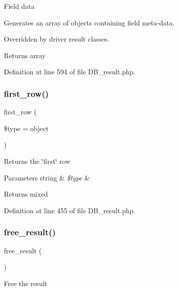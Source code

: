 Field data

Generates an array of objects containing field meta-\/data.

Overridden by driver result classes.

\begin{DoxyReturn}{Returns}
array 
\end{DoxyReturn}


Definition at line 594 of file D\+B\+\_\+result.\+php.

\mbox{\label{class_c_i___d_b__result_a9d7ddad4b02edf86c4f1ec27c0c8a2d7}} 
\subsubsection{\texorpdfstring{first\_row()}{first\_row()}}
{\footnotesize\ttfamily first\+\_\+row (\begin{DoxyParamCaption}\item[{}]{\$type = {\ttfamily \textquotesingle{}object\textquotesingle{}} }\end{DoxyParamCaption})}

Returns the \char`\"{}first\char`\"{} row


\begin{DoxyParams}[1]{Parameters}
string & {\em \$type} & \\
\hline
\end{DoxyParams}
\begin{DoxyReturn}{Returns}
mixed 
\end{DoxyReturn}


Definition at line 455 of file D\+B\+\_\+result.\+php.

\mbox{\label{class_c_i___d_b__result_aad2d98d6beb3d6095405356c6107b473}} 
\subsubsection{\texorpdfstring{free\_result()}{free\_result()}}
{\footnotesize\ttfamily free\+\_\+result (\begin{DoxyParamCaption}{ }\end{DoxyParamCaption})}

Free the result

